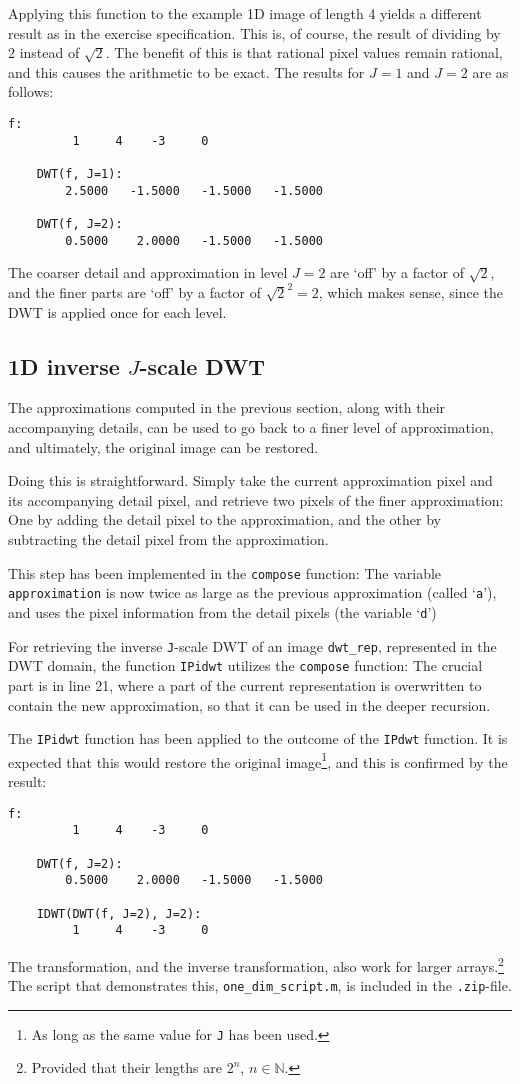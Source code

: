 Applying this function to the example 1D image of length 4 yields a different result as in the exercise specification.
This is, of course, the result of dividing by \(2\) instead of \(\sqrt{2}\).
The benefit of this is that rational pixel values remain rational, and this causes the arithmetic to be exact.
The results for \(J=1\) and \(J=2\) are as follows:
\begin{lstlisting}[basicstyle=\ttfamily\small]
    f:
         1     4    -3     0

    DWT(f, J=1):
        2.5000   -1.5000   -1.5000   -1.5000

    DWT(f, J=2):
        0.5000    2.0000   -1.5000   -1.5000
\end{lstlisting}
The coarser detail and approximation in level \(J = 2\) are `off' by a factor of \(\sqrt{2}\), and the finer parts are `off' by a factor of \(\sqrt{2}^2=2\), which makes sense, since the DWT is applied once for each level.

\subsection{\texorpdfstring{1D inverse \(J\)-scale DWT}{1D inverse J-scale DWT}}
The approximations computed in the previous section, along with their accompanying details, can be used to go back to a finer level of approximation, and ultimately, the original image can be restored.

Doing this is straightforward.
Simply take the current approximation pixel and its accompanying detail pixel, and retrieve two pixels of the finer approximation:
One by adding the detail pixel to the approximation, and the other by subtracting the detail pixel from the approximation.

This step has been implemented in the \texttt{compose} function:
The variable \texttt{approximation} is now twice as large as the previous approximation (called `\texttt{a}'), and uses the pixel information from the detail pixels (the variable `\texttt{d}') 

For retrieving the inverse \texttt{J}-scale DWT of an image \texttt{dwt\_rep}, represented in the DWT domain, the function \texttt{IPidwt} utilizes the \texttt{compose} function:
The crucial part is in line 21, where a part of the current representation is overwritten to contain the new approximation, so that it can be used in the deeper recursion.

The \texttt{IPidwt} function has been applied to the outcome of the \texttt{IPdwt} function.
It is expected that this would restore the original image\footnote{As long as the same value for \texttt{J} has been used.}, and this is confirmed by the result:
\begin{lstlisting}[basicstyle=\ttfamily\small]
    f:
         1     4    -3     0

    DWT(f, J=2):
        0.5000    2.0000   -1.5000   -1.5000

    IDWT(DWT(f, J=2), J=2):
         1     4    -3     0
\end{lstlisting}

The transformation, and the inverse transformation, also work for larger arrays.\footnote{Provided that their lengths are \(2^n\), \(n \in \mathbb{N}\).}
The script that demonstrates this, \texttt{one\_dim\_script.m}, is included in the \texttt{.zip}-file.

\clearpage